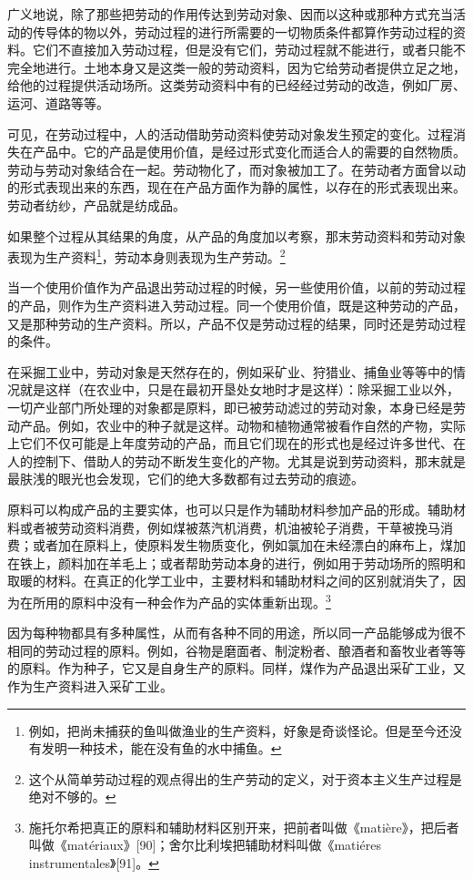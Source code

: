 \documentclass{ctexbook}
\begin{document}
    广义地说，除了那些把劳动的作用传达到劳动对象、因而以这种或那种方式充当活动的传导体的物以外，劳动过程的进行所需要的一切物质条件都算作劳动过程的资料。它们不直接加入劳动过程，但是没有它们，劳动过程就不能进行，或者只能不完全地进行。土地本身又是这类一般的劳动资料，因为它给劳动者提供立足之地，给他的过程提供活动场所。这类劳动资料中有的已经经过劳动的改造，例如厂房、运河、道路等等。

    可见，在劳动过程中，人的活动借助劳动资料使劳动对象发生预定的变化。过程消失在产品中。它的产品是使用价值，是经过形式变化而适合人的需要的自然物质。劳动与劳动对象结合在一起。劳动物化了，而对象被加工了。在劳动者方面曾以动的形式表现出来的东西，现在在产品方面作为静的属性，以存在的形式表现出来。劳动者纺纱，产品就是纺成品。

    如果整个过程从其结果的角度，从产品的角度加以考察，那末劳动资料和劳动对象表现为生产资料\footnote{例如，把尚未捕获的鱼叫做渔业的生产资料，好象是奇谈怪论。但是至今还没有发明一种技术，能在没有鱼的水中捕鱼。}，劳动本身则表现为生产劳动。\footnote{这个从简单劳动过程的观点得出的生产劳动的定义，对于资本主义生产过程是绝对不够的。}

    当一个使用价值作为产品退出劳动过程的时候，另一些使用价值，以前的劳动过程的产品，则作为生产资料进入劳动过程。同一个使用价值，既是这种劳动的产品，又是那种劳动的生产资料。所以，产品不仅是劳动过程的结果，同时还是劳动过程的条件。

    在采掘工业中，劳动对象是天然存在的，例如采矿业、狩猎业、捕鱼业等等中的情况就是这样（在农业中，只是在最初开垦处女地时才是这样）：除采掘工业以外，一切产业部门所处理的对象都是原料，即已被劳动滤过的劳动对象，本身已经是劳动产品。例如，农业中的种子就是这样。动物和植物通常被看作自然的产物，实际上它们不仅可能是上年度劳动的产品，而且它们现在的形式也是经过许多世代、在人的控制下、借助人的劳动不断发生变化的产物。尤其是说到劳动资料，那末就是最肤浅的眼光也会发现，它们的绝大多数都有过去劳动的痕迹。

    原料可以构成产品的主要实体，也可以只是作为辅助材料参加产品的形成。辅助材料或者被劳动资料消费，例如煤被蒸汽机消费，机油被轮子消费，干草被挽马消费；或者加在原料上，使原料发生物质变化，例如氯加在未经漂白的麻布上，煤加在铁上，颜料加在羊毛上；或者帮助劳动本身的进行，例如用于劳动场所的照明和取暖的材料。在真正的化学工业中，主要材料和辅助材料之间的区别就消失了，因为在所用的原料中没有一种会作为产品的实体重新出现。\footnote{施托尔希把真正的原料和辅助材料区别开来，把前者叫做《matière》，把后者叫做《matériaux》[90]；舍尔比利埃把辅助材料叫做《matiéres instrumentales》[91]。}

    因为每种物都具有多种属性，从而有各种不同的用途，所以同一产品能够成为很不相同的劳动过程的原料。例如，谷物是磨面者、制淀粉者、酿酒者和畜牧业者等等的原料。作为种子，它又是自身生产的原料。同样，煤作为产品退出采矿工业，又作为生产资料进入采矿工业。
\end{document}
